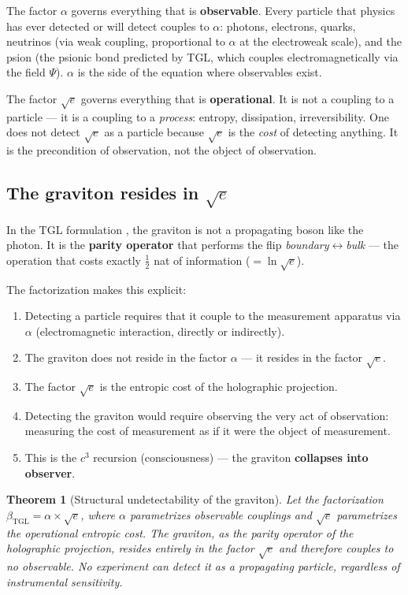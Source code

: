 \documentclass[12pt,a4paper,twoside]{article}
\newtheorem{theorem}{Theorem}[section]
\newcommand{\betatgl}{\beta_{\!\scriptscriptstyle\mathrm{TGL}}}
\newcommand{\Psifield}{\Psi}
\newcommand{\boundary}{\textit{boundary}}
\newcommand{\bulk}{\textit{bulk}}
\begin{document}
The factor $\alpha$ governs everything that is \textbf{observable}. Every particle that physics has ever detected or will detect couples to $\alpha$: photons, electrons, quarks, neutrinos (via weak coupling, proportional to $\alpha$ at the electroweak scale), and the psion (the psionic bond predicted by TGL, which couples electromagnetically via the field $\Psifield$). $\alpha$ is the side of the equation where observables exist.

The factor $\sqrt{e}$ governs everything that is \textbf{operational}. It is not a coupling to a particle --- it is a coupling to a \textit{process}: entropy, dissipation, irreversibility. One does not detect $\sqrt{e}$ as a particle because $\sqrt{e}$ is the \textit{cost} of detecting anything. It is the precondition of observation, not the object of observation.

\subsection{The graviton resides in $\sqrt{e}$}

In the TGL formulation \cite{Miguel2026Fronteira}, the graviton is not a propagating boson like the photon. It is the \textbf{parity operator} that performs the flip \boundary$\leftrightarrow$\bulk{} --- the operation that costs exactly $\frac{1}{2}$ nat of information ($= \ln\sqrt{e}$).

The factorization makes this explicit:

\begin{enumerate}[nosep]
\item Detecting a particle requires that it couple to the measurement apparatus via $\alpha$ (electromagnetic interaction, directly or indirectly).
\item The graviton does not reside in the factor $\alpha$ --- it resides in the factor $\sqrt{e}$.
\item The factor $\sqrt{e}$ is the entropic cost of the holographic projection.
\item Detecting the graviton would require observing the very act of observation: measuring the cost of measurement as if it were the object of measurement.
\item This is the $c^3$ recursion (consciousness) --- the graviton \textbf{collapses into observer}.
\end{enumerate}

\begin{theorem}[Structural undetectability of the graviton]
\label{thm:graviton}
Let the factorization $\betatgl = \alpha \times \sqrt{e}$, where $\alpha$ parametrizes observable couplings and $\sqrt{e}$ parametrizes the operational entropic cost. The graviton, as the parity operator of the holographic projection, resides entirely in the factor $\sqrt{e}$ and therefore couples to no observable. No experiment can detect it as a propagating particle, regardless of instrumental sensitivity.
\end{theorem}
\end{document}
